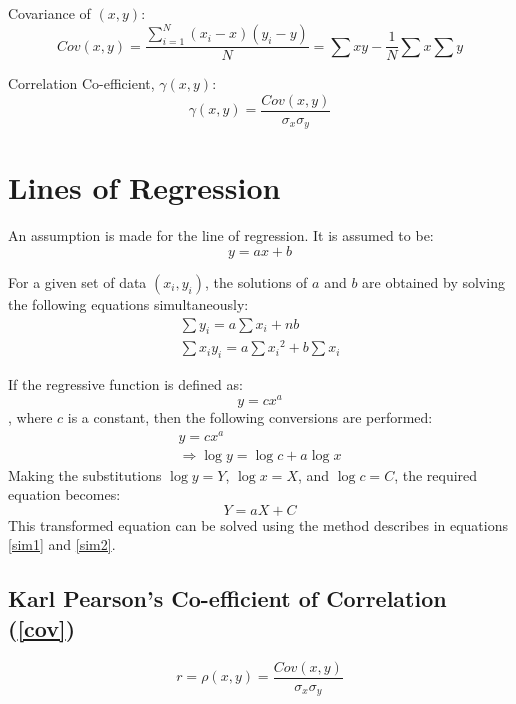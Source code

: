 \documentclass[openany, oneside]{book}
\begin{document}
Covariance of $(x,y)$:
\begin{equation}
Cov(x,y)=\dfrac{\sum_{i=1}^N(x_i-x)(y_i-y)}{N}=\sum xy -\dfrac{1}{N} \sum x \sum y
\end{equation}

Correlation Co-efficient, $\gamma(x,y)$:
\begin{equation}\label{cov}
\gamma(x,y)=\dfrac{Cov(x,y)}{\sigma_x \sigma_y}
\end{equation}

\large{\chapter{Lines of Regression}}
An assumption is made for the line of regression. It is assumed to be:
\begin{equation}
y=ax+b\nonumber
\end{equation}

For a given set of data $(x_i,y_i)$, the solutions of $a$ and $b$ are obtained by solving the following equations simultaneously:
\begin{align}
\sum y_i=a\sum x_i+nb \\
\sum x_iy_i=a\sum {x_i}^2+b\sum	x_i \label{sim2}
\end{align}

If the regressive function is defined as:
\begin{equation}
y=cx^a
\end{equation}, where $c$ is a constant, then the following conversions are performed:
\begin{align}
y=cx^a\\
\Rightarrow \log y=\log c+a\log x
\end{align}
Making the substitutions $\log y=Y$, $\log x=X$, and $\log	c=C$, the required equation becomes:
\begin{equation}
Y=aX+C
\end{equation}
This transformed equation can be solved using the method describes in equations \ref{sim1} and \ref{sim2}.

\section{Karl Pearson's Co-efficient of Correlation (\ref{cov})}
\begin{equation}
r=\rho(x,y)=\dfrac{Cov(x,y)}{\sigma_x\sigma_y}
\end{equation}
\end{document}
